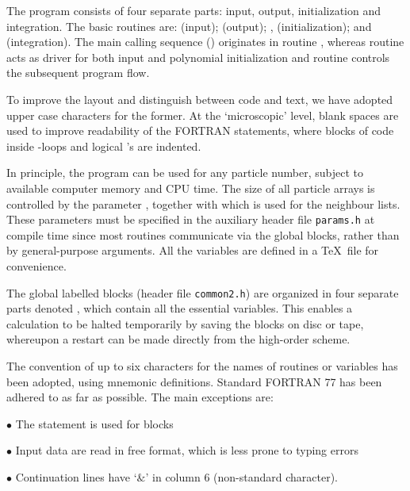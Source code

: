    The program consists of four separate parts: input, output,
initialization and integration.
The basic routines are:  (input);
 (output);
,  (initialization); and 
 (integration).
The main calling sequence () originates in
routine ,
whereas routine  acts as driver for both input and
polynomial initialization and routine  controls the
subsequent program flow.

To improve the layout
and distinguish between code and text, we have adopted upper case characters
for the former.
At the `microscopic' level, blank spaces are used to improve
readability of the FORTRAN statements, where blocks of code inside
-loops and logical 's are indented.

In principle, the program can be used for any particle number,
subject to available computer memory and CPU time.
The size of all particle arrays is controlled by the parameter ,
together with  which is used for the neighbour lists.
These parameters must be specified in the auxiliary header file {\tt params.h}
at compile time since most routines communicate via the global 
blocks, rather than by general-purpose arguments.
All the  variables are defined in a \TeX\ file for convenience.

   The global labelled  blocks (header file {\tt common2.h})
are organized in four separate parts denoted
, which contain all the essential variables.
This enables a calculation to be halted temporarily by saving the 
blocks on disc or tape, whereupon a restart can be made directly from the
high-order scheme.

   The convention of up to six characters for the names of
routines or variables has been adopted, using mnemonic definitions.
Standard FORTRAN 77 has been adhered to as far as possible.
The main exceptions are: 
\smallskip
\item{$\bullet$} {The  statement is used for  blocks}
\item{$\bullet$} {Input data are read in free format, which is less
prone to typing errors}
\item{$\bullet$} {Continuation lines have `$\&$' in column 6 (non-standard character).}

